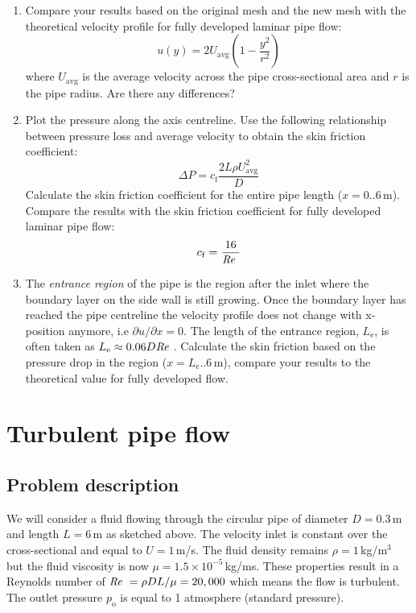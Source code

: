 \documentclass[11pt,a4paper,oneside]{scrartcl}
\newcommand\Rey{\mbox{\textit{Re}}\,\,}
\begin{document}
\begin{enumerate}
\item Compare your results based on the original mesh and the new mesh with the theoretical velocity profile for fully developed laminar pipe flow:
\begin{equation}
    u(y)=2U_\mathrm{avg}\left(1-\frac{y^2}{r^2}\right)
\end{equation}
where $U_\mathrm{avg}$ is the average velocity across the pipe cross-sectional area and $r$ is the pipe radius.
Are there any differences?
\item Plot the pressure along the axis centreline. Use the following relationship between pressure loss and average velocity to obtain the skin friction coefficient:
\begin{equation}
    \Delta P=c_\mathrm{f}\frac{2L\rho U_\mathrm{avg}^2}{D}
\end{equation}
Calculate the skin friction coefficient for the entire pipe length ($x=0..6$\,m). Compare the results with the skin friction coefficient for fully developed laminar pipe flow:
\begin{equation}
    c_\mathrm{f}=\frac{16}{\Rey}
\end{equation}
\item The \emph{entrance region} of the pipe is the region after the inlet where the boundary layer on the side wall is still growing. Once the boundary layer has reached the pipe centreline the velocity profile does not change with x-position anymore, i.e  $\partial u/\partial x=0$. The length of the entrance region, $L_\mathrm{e}$, is often taken as $L_\mathrm{e}\approx0.06D\Rey$. Calculate the skin friction based on the pressure drop in the region ($x=L_\mathrm{e}..6$\,m), compare your results to the theoretical value for fully developed flow.
\end{enumerate}

\section{Turbulent pipe flow}


\subsection{Problem description}

We will consider a fluid flowing through the circular pipe of diameter $D=0.3$\,m and length $L=6$\,m as sketched above. The velocity inlet is constant over the cross-sectional and equal to $U=1$\,m/s. The  fluid density remains $\rho=1$\,kg/m$^3$ but the fluid viscosity is now $\mu=1.5\times10^{-5}$\,kg/ms. These properties result in a Reynolds number of $\Rey=\rho DL/\mu=20,000$ which means the flow is turbulent. The outlet pressure $p_\mathrm{o}$ is equal to 1 atmosphere (standard pressure).\\
\end{document}
